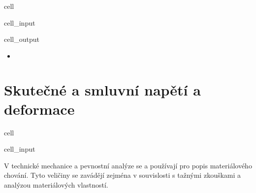 \documentclass[letterpaper,10pt,english]{jupyterBook}
\begin{document}
{{\begin{sphinxuseclass}{cell}
\begin{sphinxVerbatimInput}
\begin{sphinxuseclass}{cell_input}
\end{sphinxuseclass}\end{sphinxVerbatimInput}
\begin{sphinxVerbatimOutput}

\begin{sphinxuseclass}{cell_output}
\noindent{}

\end{sphinxuseclass}\end{sphinxVerbatimOutput}

\end{sphinxuseclass}\begin{itemize}
\item {} 
\sphinxAtStartPar
{}

\end{itemize}

\sphinxstepscope


\section{Skutečné a smluvní napětí a deformace}
\label{\detokenize{Prednasky/2_6_In_u017een_xfdrsk_xe9_a_skute_u010dn_xe9_nap_u011bt_xed:skutecne-a-smluvni-napeti-a-deformace}}\label{\detokenize{Prednasky/2_6_In_u017een_xfdrsk_xe9_a_skute_u010dn_xe9_nap_u011bt_xed::doc}}
\begin{sphinxuseclass}{cell}\begin{sphinxVerbatimInput}

\begin{sphinxuseclass}{cell_input}
\begin{sphinxVerbatim}[commandchars=\\\{\}]
   
   
\end{sphinxVerbatim}

\end{sphinxuseclass}\end{sphinxVerbatimInput}

\end{sphinxuseclass}
\sphinxAtStartPar
V technické mechanice a pevnostní analýze se  a  používají pro popis materiálového chování. Tyto veličiny se zavádějí zejména v souvislosti s tažnými zkouškami a analýzou materiálových vlastností.

}}
\end{document}
